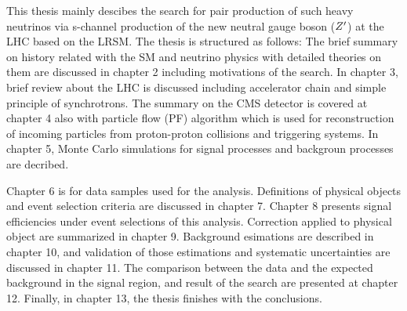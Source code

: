 This thesis mainly descibes the search for pair production of such heavy neutrinos via s-channel production of the new neutral gauge boson (${Z}^{\prime}$) at the LHC based on the LRSM. The thesis is
structured as follows: The brief summary on history related with the SM and neutrino physics with detailed theories on them are discussed in chapter 2 including motivations
of the search. In chapter 3, brief review about the LHC is discussed including accelerator chain and simple principle of synchrotrons. The summary on the CMS detector is covered at chapter 4 also with
particle flow (PF) algorithm which is used for reconstruction of incoming particles from proton-proton collisions and triggering systems. In chapter 5, Monte Carlo simulations for signal processes and
backgroun processes are decribed. 

Chapter 6 is for data samples used for the analysis. Definitions of physical objects and event selection criteria are discussed in chapter 7.
Chapter 8 presents signal efficiencies under event selections of this analysis.
Correction applied to physical object are summarized in chapter 9. Background esimations are described in
chapter 10, and validation of those estimations and systematic uncertainties are discussed in chapter 11. The comparison between the data and the expected background in the signal region,
and result of the search are presented at chapter 12. Finally, in chapter 13, the thesis finishes with the conclusions.
